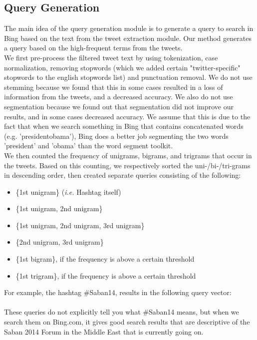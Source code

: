 \subsection{Query Generation}
The main idea of the query generation module is to generate a query to search in Bing based on the text from the tweet extraction module. Our method generates a query based on the high-frequent terms from the tweets.\\
We first pre-process the filtered tweet text by using tokenization, case normalization, removing stopwords (which we added certain "twitter-specific" stopwords to the english stopwords list) and punctuation removal. We do not use stemming because we found that this in some cases resulted in a loss of information from the tweets, and a decreased accuracy. We also do not use segmentation because we found out that segmentation did not improve our results, and in some cases decreased accuracy. We assume that this is due to the fact that when we search something in Bing that contains concatenated words (e.g. 'presidentobama'), Bing does a better job segmenting the two words 'president' and 'obama' than the word segment toolkit. \\
We then counted the frequency of unigrams, bigrams, and trigrams that occur in the tweets. Based on this counting, we respectively sorted the uni-/bi-/tri-grams in descending order,  then created separate queries consisting of the following:
\begin{itemize}
	\item \{1st unigram\} (\textit{i.e.} Hashtag itself)
	\item \{1st unigram, 2nd unigram\}
	\item \{1st unigram, 2nd unigram, 3rd unigram\}
	\item \{2nd unigram, 3rd unigram\}
	\item \{1st bigram\}, if the frequency is above a certain threshold
	\item \{1st trigram\}, if the frequency is above a certain threshold
\end{itemize}

For example, the hashtag
\#Saban14, results in the following query vector: \\  
\\
These queries do not explicitly tell you what \#Saban14 means, but when we search them on Bing.com, it gives good search results that are descriptive of the Saban 2014 Forum in the Middle East that is currently going on.